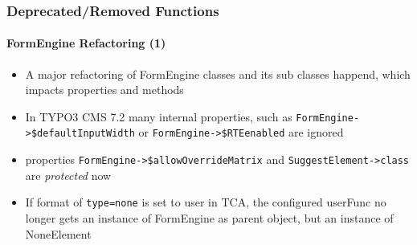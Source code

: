 \begin{frame}[fragile]
	\frametitle{Deprecated/Removed Functions}
	\framesubtitle{FormEngine Refactoring (1)}

	\begin{itemize}

		\item A major refactoring of FormEngine classes and its sub classes
			happend, which impacts properties and methods

		\item In TYPO3 CMS 7.2 many internal properties, such as
			\small\texttt{FormEngine->\$defaultInputWidth}\normalsize\space
			or
			\small\texttt{FormEngine->\$RTEenabled}\normalsize\space\newline
			are ignored

		\item properties
			\small\texttt{FormEngine->\$allowOverrideMatrix}\normalsize\space
			and
			\small\texttt{SuggestElement->class}\normalsize\space
			are \textit{protected} now

		\item If format of \texttt{type=none} is set to user in TCA, the configured
			userFunc no longer gets an instance of FormEngine as parent object,
			but an instance of NoneElement

	\end{itemize}

\end{frame}


